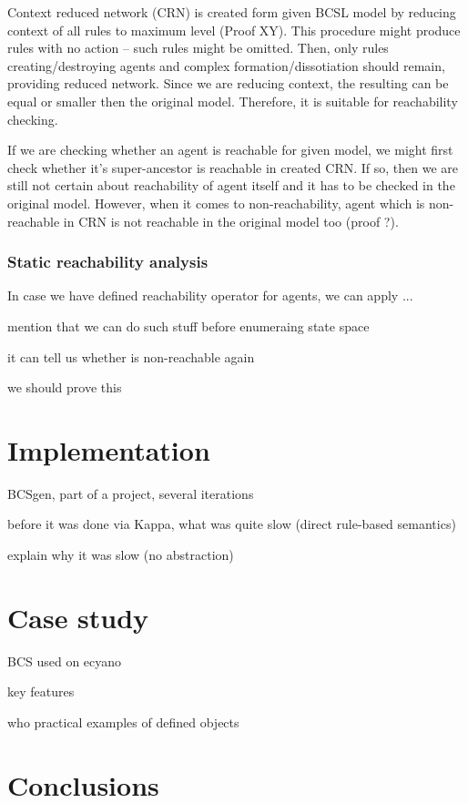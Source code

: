 \documentclass[12pt]{fithesis2}
\begin{document}
Context reduced network (CRN) is created form given BCSL model by reducing context of all rules to maximum level (Proof XY). This procedure might produce rules with no action -- such rules might be omitted. Then, only rules creating/destroying agents and complex formation/dissotiation should remain, providing reduced network. Since we are reducing context, the resulting can be equal or smaller then the original model. Therefore, it is suitable for reachability checking. 

If we are checking whether an agent is reachable for given model, we might first check whether it's super-ancestor is reachable in created CRN. If so, then we are still not certain about reachability of agent itself and it has to be checked in the original model. However, when it comes to non-reachability, agent which is non-reachable in CRN is not reachable in the original model too (proof ?).

\subsection{Static reachability analysis}

In case we have defined reachability operator for agents, we can apply ...

mention that we can do such stuff before enumeraing state space

it can tell us whether is non-reachable again

we should prove this

\chapter{Implementation}

BCSgen, part of a project, several iterations

before it was done via Kappa, what was quite slow (direct rule-based semantics)

explain why it was slow (no abstraction)

\chapter{Case study}

BCS used on ecyano

key features

who practical examples of defined objects

\chapter{Conclusions}

\printbibliography
\end{document}
